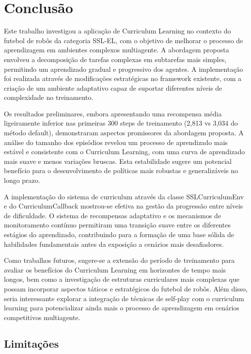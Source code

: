 \chapter{Conclusão}
\label{cap:conclusao}

Este trabalho investigou a aplicação de Curriculum Learning no contexto do futebol de robôs da categoria SSL-EL, com o objetivo de melhorar o processo de aprendizagem em ambientes complexos multiagente. A abordagem proposta envolveu a decomposição de tarefas complexas em subtarefas mais simples, permitindo um aprendizado gradual e progressivo dos agentes. A implementação foi realizada através de modificações estratégicas no framework existente, com a criação de um ambiente adaptativo capaz de suportar diferentes níveis de complexidade no treinamento.

Os resultados preliminares, embora apresentando uma recompensa média ligeiramente inferior nas primeiras 300 steps de treinamento (2,813 vs 3,034 do método default), demonstraram aspectos promissores da abordagem proposta. A análise do tamanho dos episódios revelou um processo de aprendizado mais estável e consistente com o Curriculum Learning, com uma curva de aprendizado mais suave e menos variações bruscas. Esta estabilidade sugere um potencial benefício para o desenvolvimento de políticas mais robustas e generalizáveis no longo prazo.

A implementação do sistema de curriculum através da classe SSLCurriculumEnv e do CurriculumCallback mostrou-se efetiva na gestão da progressão entre níveis de dificuldade. O sistema de recompensas adaptativo e os mecanismos de monitoramento contínuo permitiram uma transição suave entre os diferentes estágios do aprendizado, contribuindo para a formação de uma base sólida de habilidades fundamentais antes da exposição a cenários mais desafiadores.

Como trabalhos futuros, sugere-se a extensão do período de treinamento para avaliar os benefícios do Curriculum Learning em horizontes de tempo mais longos, bem como a investigação de estruturas curriculares mais complexas que possam incorporar aspectos táticos e estratégicos do futebol de robôs. Além disso, seria interessante explorar a integração de técnicas de self-play com o curriculum learning para potencializar ainda mais o processo de aprendizagem em cenários competitivos multiagente.

\section{Limitações}

